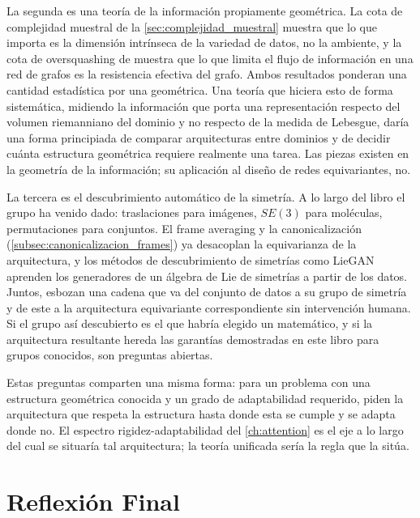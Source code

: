 La segunda es una teoría de la información propiamente geométrica. La cota de complejidad muestral de la \autoref{sec:complejidad_muestral} muestra que lo que importa es la dimensión intrínseca de la variedad de datos, no la ambiente, y la cota de \gls{oversquashing} de \citet{digiovanni2023oversquashing} muestra que lo que limita el flujo de información en una red de grafos es la resistencia efectiva del grafo. Ambos resultados ponderan una cantidad estadística por una geométrica. Una teoría que hiciera esto de forma sistemática, midiendo la información que porta una representación respecto del volumen riemanniano del dominio y no respecto de la medida de Lebesgue, daría una forma principiada de comparar arquitecturas entre dominios y de decidir cuánta estructura geométrica requiere realmente una tarea. Las piezas existen en la geometría de la información; su aplicación al diseño de redes equivariantes, no.

La tercera es el descubrimiento automático de la simetría. A lo largo del libro el grupo ha venido dado: traslaciones para imágenes, $SE(3)$ para moléculas, permutaciones para conjuntos. El frame averaging y la canonicalización (\autoref{subsec:canonicalizacion_frames}) ya desacoplan la equivarianza de la arquitectura, y los métodos de descubrimiento de simetrías como LieGAN \citep{yang2023liegan} aprenden los generadores de un álgebra de Lie de simetrías a partir de los datos. Juntos, esbozan una cadena que va del conjunto de datos a su grupo de simetría y de este a la arquitectura equivariante correspondiente sin intervención humana. Si el grupo así descubierto es el que habría elegido un matemático, y si la arquitectura resultante hereda las garantías demostradas en este libro para grupos conocidos, son preguntas abiertas.

Estas preguntas comparten una misma forma: para un problema con una estructura geométrica conocida y un grado de adaptabilidad requerido, piden la arquitectura que respeta la estructura hasta donde esta se cumple y se adapta donde no. El espectro rigidez-adaptabilidad del \autoref{ch:attention} es el eje a lo largo del cual se situaría tal arquitectura; la teoría unificada sería la regla que la sitúa.


\section{Reflexión Final}


